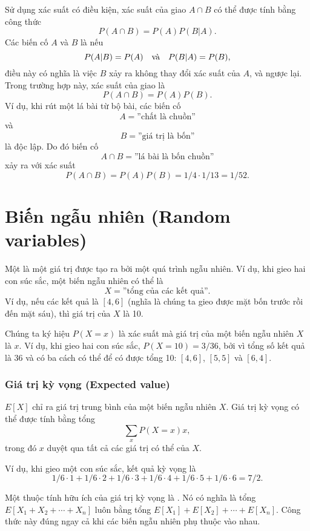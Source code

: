 
Sử dụng xác suất có điều kiện,
xác suất của giao
$A \cap B$ có thể được tính bằng công thức
\[P(A \cap B)=P(A)P(B|A).\]
Các biến cố $A$ và $B$ là  nếu
\[P(A|B)=P(A) \hspace{10px}\textrm{và}\hspace{10px} P(B|A)=P(B),\]
điều này có nghĩa là việc $B$ xảy ra không
thay đổi xác suất của $A$, và ngược lại.
Trong trường hợp này, xác suất của giao là
\[P(A \cap B)=P(A)P(B).\]
Ví dụ, khi rút một lá bài từ bộ bài, các biến cố
\[A = \textrm{''chất là chuồn''}\]
và
\[B = \textrm{''giá trị là bốn''}\]
là độc lập. Do đó biến cố
\[A \cap B = \textrm{''lá bài là bốn chuồn''}\]
xảy ra với xác suất
\[P(A \cap B)=P(A)P(B)=1/4 \cdot 1/13 = 1/52.\]

\section{Biến ngẫu nhiên (Random variables)}


Một  là một giá trị được tạo ra
bởi một quá trình ngẫu nhiên.
Ví dụ, khi gieo hai con súc sắc,
một biến ngẫu nhiên có thể là
\[X=\textrm{''tổng của các kết quả''}.\]
Ví dụ, nếu các kết quả là $[4,6]$
(nghĩa là chúng ta gieo được mặt bốn trước rồi đến mặt sáu),
thì giá trị của $X$ là 10.

Chúng ta ký hiệu $P(X=x)$ là xác suất mà
giá trị của một biến ngẫu nhiên $X$ là $x$.
Ví dụ, khi gieo hai con súc sắc,
$P(X=10)=3/36$,
bởi vì tổng số kết quả là 36
và có ba cách có thể để có được
tổng 10: $[4,6]$, $[5,5]$ và $[6,4]$.

\subsubsection{Giá trị kỳ vọng (Expected value)}


 $E[X]$ chỉ ra
giá trị trung bình của một biến ngẫu nhiên $X$.
Giá trị kỳ vọng có thể được tính bằng tổng
\[\sum_x P(X=x)x,\]
trong đó $x$ duyệt qua tất cả các giá trị có thể của $X$.

Ví dụ, khi gieo một con súc sắc,
kết quả kỳ vọng là
\[1/6 \cdot 1 + 1/6 \cdot 2 + 1/6 \cdot 3 + 1/6 \cdot 4 + 1/6 \cdot 5 + 1/6 \cdot 6 = 7/2.\]

Một thuộc tính hữu ích của giá trị kỳ vọng là .
Nó có nghĩa là tổng
$E[X_1+X_2+\cdots+X_n]$
luôn bằng tổng
$E[X_1]+E[X_2]+\cdots+E[X_n]$.
Công thức này đúng ngay cả khi các biến ngẫu nhiên
phụ thuộc vào nhau.

